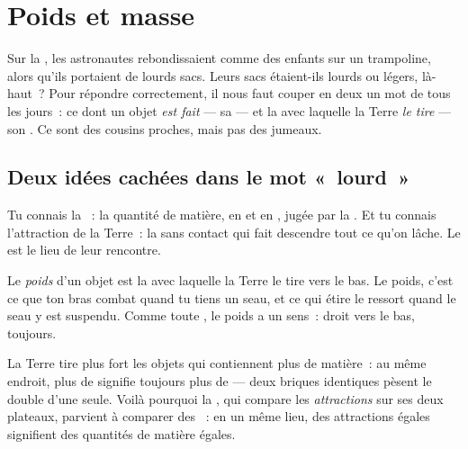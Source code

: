 \chapter{Poids et masse}\label{ch:g4:weight-and-mass}

Sur la , les astronautes rebondissaient comme des enfants sur un
trampoline, alors qu'ils portaient de lourds sacs. Leurs sacs
étaient-ils lourds ou légers, là-haut~? Pour répondre correctement,
il nous faut couper en deux un mot de tous les jours~: ce dont un
objet \emph{est fait} --- sa  --- et la  avec laquelle la
Terre \emph{le tire} --- son . Ce sont des cousins proches, mais
pas des jumeaux.

\section{Deux idées cachées dans le mot «~lourd~»}

Tu connais la ~: la quantité de matière, en  et en
, jugée par la . Et tu connais l'attraction de la
Terre~: la  sans contact qui fait descendre tout ce qu'on lâche.
Le  est le lieu de leur rencontre.

\begin{definition}[Poids]\label{def:g4:weight-and-mass:weight}
Le \emph{poids} d'un objet est la  avec laquelle la
Terre le tire vers le bas. Le poids, c'est ce que ton bras combat
quand tu tiens un seau, et ce qui étire le ressort quand le seau y
est suspendu. Comme toute , le poids a un sens~: droit vers le
bas, toujours.
\end{definition}

\begin{proposition}\label{prop:g4:weight-and-mass:morestuff}
La Terre tire plus fort les objets qui contiennent plus de matière~:
au même endroit, plus de  signifie toujours plus de  ---
deux briques identiques pèsent le double d'une seule. Voilà pourquoi
la , qui compare les \emph{attractions} sur ses deux plateaux,
parvient à comparer des \emph{}~: en un même lieu, des
attractions égales signifient des quantités de matière égales.
\end{proposition}


